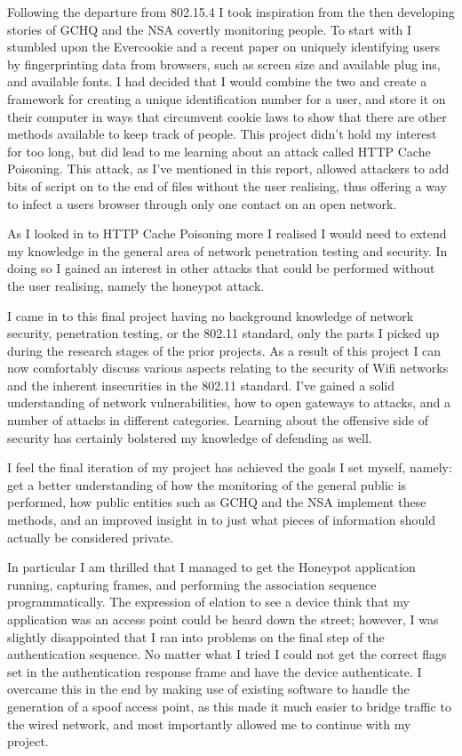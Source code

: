 Following the departure from 802.15.4 I took inspiration from the then developing stories of GCHQ and the NSA covertly monitoring people. To start with I stumbled upon the Evercookie and a recent paper on uniquely identifying users by fingerprinting data from browsers, such as screen size and available plug ins, and available fonts. I had decided that I would combine the two and create a framework for creating a unique identification number for a user, and store it on their computer in ways that circumvent cookie laws to show that there are other methods available to keep track of people. This project didn't hold my interest for too long, but did lead to me learning about an attack called HTTP Cache Poisoning. This attack, as I've mentioned in this report, allowed attackers to add bits of script on to the end of files without the user realising, thus offering a way to infect a users browser through only one contact on an open network.

As I looked in to HTTP Cache Poisoning more I realised I would need to extend my knowledge in the general area of network penetration testing and security. In doing so I gained an interest in other attacks that could be performed without the user realising, namely the honeypot attack.

I came in to this final project having no background knowledge of network security, penetration testing, or the 802.11 standard, only the parts I picked up during the research stages of the prior projects. As a result of this project I can now comfortably discuss various aspects relating to the security of Wifi networks and the inherent insecurities in the 802.11 standard. I’ve gained a solid understanding of network vulnerabilities, how to open gateways to attacks, and a number of attacks in different categories. Learning about the offensive side of security has certainly bolstered my knowledge of defending as well.

I feel the final iteration of my project has achieved the goals I set myself, namely: get a better understanding of how the monitoring of the general public is performed, how public entities such as GCHQ and the NSA implement these methods, and an improved insight in to just what pieces of information should actually be considered private.

In particular I am thrilled that I managed to get the Honeypot application running, capturing frames, and performing the association sequence programmatically. The expression of elation to see a device think that my application was an access point could be heard down the street; however, I was slightly disappointed that I ran into problems on the final step of the authentication sequence. No matter what I tried I could not get the correct flags set in the authentication response frame and have the device authenticate. I overcame this in the end by making use of existing software to handle the generation of a spoof access point, as this made it much easier to bridge traffic to the wired network, and most importantly allowed me to continue with my project.

